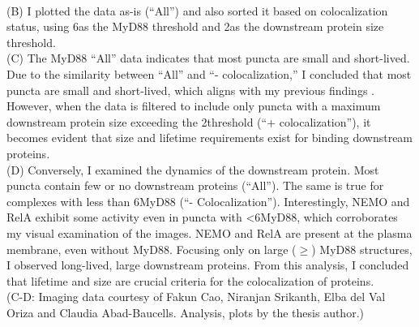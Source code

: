 \begin{centering}
{\vspace{1em}
\\
(B) I plotted the data as-is (“All”) and also sorted it based on colocalization status, using 6\times as the MyD88 threshold and 2\times as the downstream protein size threshold.
\vspace{1em}
\\
(C) The MyD88 “All” data indicates that most puncta are small and short-lived. Due to the similarity between “All” and “- colocalization,” I concluded that most puncta are small and short-lived, which aligns with my previous findings \autocite{Deliz-Aguirre_2021}. However, when the data is filtered to include only puncta with a maximum downstream protein size exceeding the 2\times threshold (“+ colocalization”), it becomes evident that size and lifetime requirements exist for binding downstream proteins.
\vspace{1em}
\\
(D) Conversely, I examined the dynamics of the downstream protein. Most puncta contain few or no downstream proteins (“All”). The same is true for complexes with less than 6\times MyD88 (“- Colocalization”). Interestingly, NEMO and RelA exhibit some activity even in puncta with <6\times MyD88, which corroborates my visual examination of the images. NEMO and RelA are present at the plasma membrane, even without MyD88. Focusing only on large ($\geq$) MyD88 structures, I observed long-lived, large downstream proteins. From this analysis, I concluded that lifetime and size are crucial criteria for the colocalization of proteins.
\vspace{1em}
\\
(C-D: Imaging data courtesy of Fakun Cao, Niranjan Srikanth, Elba del Val Oriza and Claudia Abad-Baucells. Analysis, plots by the thesis author.)}
\label{p2:S1}
\end{centering}

